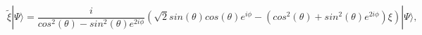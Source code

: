 \begin{equation}
\label{keyPsi}
{\widetilde \xi}|\Psi \rangle =
\frac{i}{cos^2(\theta)-sin^2(\theta)e^{2i\phi}}
(\sqrt{2}sin(\theta)cos(\theta)e^{i\phi} -
(cos^2(\theta)+sin^2(\theta)e^{2i\phi})\xi)|\Psi\rangle,
\end{equation}

